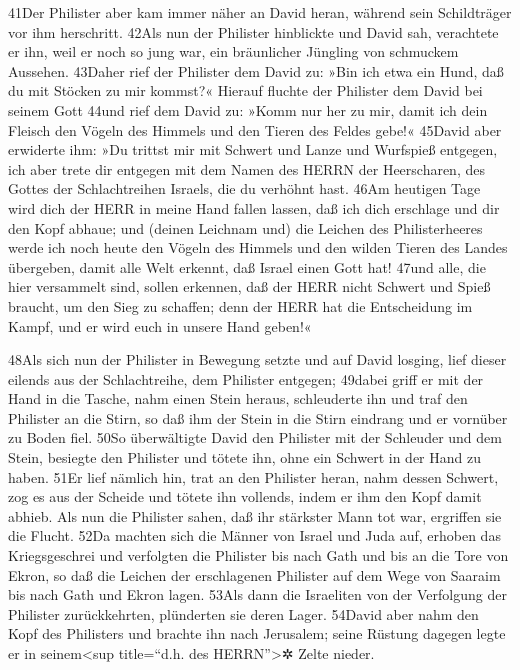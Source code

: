 41Der Philister aber kam immer näher an David heran, während sein
Schildträger vor ihm herschritt. 42Als nun der Philister hinblickte und
David sah, verachtete er ihn, weil er noch so jung war, ein bräunlicher
Jüngling von schmuckem Aussehen. 43Daher rief der Philister dem David
zu: »Bin ich etwa ein Hund, daß du mit Stöcken zu mir kommst?« Hierauf
fluchte der Philister dem David bei seinem Gott 44und rief dem David zu:
»Komm nur her zu mir, damit ich dein Fleisch den Vögeln des Himmels und
den Tieren des Feldes gebe!« 45David aber erwiderte ihm: »Du trittst mir
mit Schwert und Lanze und Wurfspieß entgegen, ich aber trete dir
entgegen mit dem Namen des HERRN der Heerscharen, des Gottes der
Schlachtreihen Israels, die du verhöhnt hast. 46Am heutigen Tage wird
dich der HERR in meine Hand fallen lassen, daß ich dich erschlage und
dir den Kopf abhaue; und (deinen Leichnam und) die Leichen des
Philisterheeres werde ich noch heute den Vögeln des Himmels und den
wilden Tieren des Landes übergeben, damit alle Welt erkennt, daß Israel
einen Gott hat! 47und alle, die hier versammelt sind, sollen erkennen,
daß der HERR nicht Schwert und Spieß braucht, um den Sieg zu schaffen;
denn der HERR hat die Entscheidung im Kampf, und er wird euch in unsere
Hand geben!«

48Als sich nun der Philister in Bewegung setzte und auf David losging,
lief dieser eilends aus der Schlachtreihe, dem Philister entgegen;
49dabei griff er mit der Hand in die Tasche, nahm einen Stein heraus,
schleuderte ihn und traf den Philister an die Stirn, so daß ihm der
Stein in die Stirn eindrang und er vornüber zu Boden fiel. 50So
überwältigte David den Philister mit der Schleuder und dem Stein,
besiegte den Philister und tötete ihn, ohne ein Schwert in der Hand zu
haben. 51Er lief nämlich hin, trat an den Philister heran, nahm dessen
Schwert, zog es aus der Scheide und tötete ihn vollends, indem er ihm
den Kopf damit abhieb. Als nun die Philister sahen, daß ihr stärkster
Mann tot war, ergriffen sie die Flucht. 52Da machten sich die Männer von
Israel und Juda auf, erhoben das Kriegsgeschrei und verfolgten die
Philister bis nach Gath und bis an die Tore von Ekron, so daß die
Leichen der erschlagenen Philister auf dem Wege von Saaraim bis nach
Gath und Ekron lagen. 53Als dann die Israeliten von der Verfolgung der
Philister zurückkehrten, plünderten sie deren Lager. 54David aber nahm
den Kopf des Philisters und brachte ihn nach Jerusalem; seine Rüstung
dagegen legte er in seinem\textless sup title=``d.h. des
HERRN''\textgreater✲ Zelte nieder.

